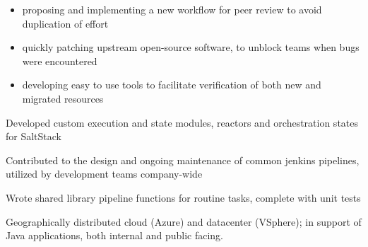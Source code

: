 \begin{cventries}
{\begin{cvitems}
{\begin{itemize}[leftmargin=*,label={\bullet}]
              \item proposing and implementing a new workflow for peer review to avoid duplication of effort
              \item quickly patching upstream open-source software, to unblock teams when bugs were encountered
              \item developing easy to use tools to facilitate verification of both new and migrated resources
          \end{itemize}
        }
        \item {Developed custom execution and state modules, reactors and orchestration states for SaltStack}
        \item {Contributed to the design and ongoing maintenance of common jenkins pipelines, utilized by development teams company-wide}
        \item {Wrote shared library pipeline functions for routine tasks, complete with unit tests}
      \end{cvitems}
    }
    {
      \begin{cventrysummary} %
        Geographically distributed cloud (Azure) and datacenter (VSphere); in support of Java applications, both internal and public facing.
      \end{cventrysummary}
    }



\end{cventries}
